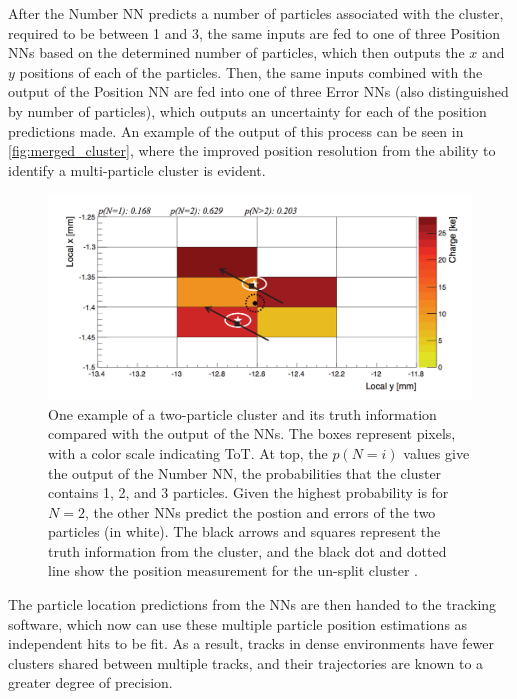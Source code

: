 After the Number \ac{NN} predicts a number of particles associated with the cluster, required to be between 1 and 3, the same inputs are fed to one of three Position \acp{NN} based on the determined number of particles, which then outputs the $x$ and $y$ positions of each of the particles. Then, the same inputs combined with the output of the Position \ac{NN} are fed into one of three Error \acp{NN} (also distinguished by number of particles), which outputs an uncertainty for each of the position predictions made. An example of the output of this process can be seen in \autoref{fig:merged_cluster}, where the improved position resolution from the ability to identify a multi-particle cluster is evident. 

\begin{centering}
\begin{figure}[bth]
\myfloatalign
\includegraphics[width=.90\linewidth]{figures/nn/merged_cluster.png}
\caption{One example of a two-particle cluster and its truth information compared with the output of the \acp{NN}. The boxes represent pixels, with a color scale indicating \ac{ToT}. At top, the $p(N=i)$ values give the output of the Number \ac{NN}, the probabilities that the cluster contains 1, 2, and 3 particles. Given the highest probability is for $N=2$, the other \acp{NN} predict the postion and errors of the two particles (in white). The black arrows and squares represent the truth information from the cluster, and the black dot and dotted line show the position measurement for the un-split cluster \cite{PERF-2012-05}.}
\label{fig:merged_cluster}
\end{figure}
\end{centering}

The particle location predictions from the \acp{NN} are then handed to the tracking software, which now can use these multiple particle position estimations as independent hits to be fit. As a result, tracks in dense environments have fewer clusters shared between multiple tracks, and their trajectories are known to a greater degree of precision. 


